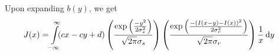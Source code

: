 \documentclass[a4paper]{article}
\begin{document}
\begin{enumerate}
Upon expanding $b(y)$, we get
\begin{align*}
J(x) &= \int\limits_{\mathclap{-\infty}}^{\mathclap{\infty}}\! (cx - cy + d) \left ( \dfrac{\exp\left (\frac{-y^2}{2\sigma_s^2}\right )}{\sqrt{2\pi}\sigma_s} \right ) \left ( \dfrac{\exp\left (\frac{-\left (I(x - y) - I(x)\right )^2}{2\sigma_r^2}\right )}{\sqrt{2\pi}\sigma_r} \right )\dfrac{1}{x} \, \mathrm{d}y
\end{align*}


\end{enumerate}
\end{document}
